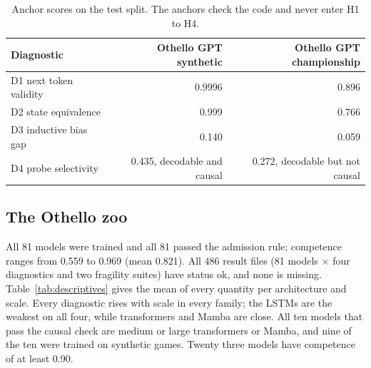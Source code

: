 \documentclass[11pt]{scrartcl}
\begin{document}
\begin{table}[H]
    \centering
    \small
    \begin{tabular}{lrr}
    \toprule
    Diagnostic & Othello GPT synthetic & Othello GPT championship \\
    \midrule
    D1 next token validity & 0.9996 & 0.896 \\
    D2 state equivalence & 0.999 & 0.766 \\
    D3 inductive bias gap & 0.140 & 0.059 \\
    D4 probe selectivity & 0.435, decodable and causal & 0.272, decodable but not causal \\
    \bottomrule
    \end{tabular}
    \caption{Anchor scores on the test split. The anchors check the code and never enter H1 to H4.}
    \label{tab:anchors}
\end{table}

\subsection{The Othello zoo}

All 81 models were trained and all 81 passed the admission rule; competence ranges from 0.559 to 0.969
(mean 0.821). All 486 result files (81 models $\times$ four diagnostics and two fragility suites) have status
ok, and none is missing. Table~\ref{tab:descriptives} gives the mean of every quantity per architecture and
scale. Every diagnostic rises with scale in every family; the LSTMs are the weakest on all four, while
transformers and Mamba are close. All ten models that pass the causal check are medium or large transformers or
Mamba, and nine of the ten were trained on synthetic games. Twenty three models have competence of at least
0.90.
\end{document}
